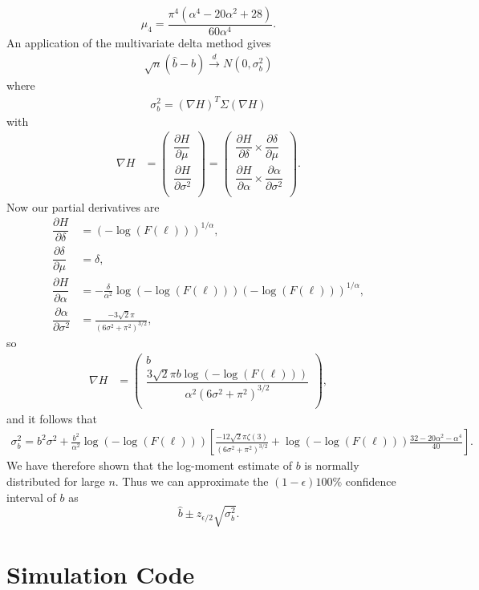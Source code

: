 \documentclass[honours,12pt]{unswthesis}
\newcommand{\1}{\mathbf 1}
\newcommand{\cd}{\overset{d}{\longrightarrow}}
\newcommand{\ppartial}[2]{\dfrac{\partial {#1}}{\partial {#2} }}
\numberwithin{equation}{section}
\theoremstyle{definition}
\theoremstyle{remark}
\begin{document}
\begin{appendices}
\[
\mu_4=\frac{\pi^4(\alpha^4-20\alpha^2+28)}{60\alpha^4}.
\] 
An application of the multivariate delta method gives
\begin{align*}
\sqrt{n}(\hat{b}-b)\cd N(0,\sigma^2_b)
\end{align*}
where
\begin{align*}
\sigma^2_b=(\nabla H)^T \Sigma (\nabla H)
\end{align*}
with
\begin{align*}
	\nabla H &=\begin{pmatrix}
		\ppartial{H}{\mu}\\
		\ppartial{H}{\sigma^2}\\
	\end{pmatrix}
	=\begin{pmatrix}
		\ppartial{H}{\delta}\times\ppartial{\delta}{\mu}\\
		\ppartial{H}{\alpha}\times\ppartial{\alpha}{\sigma^2}\\
	\end{pmatrix}.
\end{align*}
Now our partial derivatives are
\begin{align*}
\ppartial{H}{\delta}&=(-\log(F(\ell)))^{1/\alpha},\\ 
\ppartial{\delta}{\mu}&=\delta,\\
 \ppartial{H}{\alpha}&=-\frac{\delta}{\alpha^2}\log(-\log(F(\ell)))(-\log(F(\ell)))^{1/\alpha},\\ 
 \ppartial{\alpha}{\sigma^2}&=\frac{-3\sqrt{2}\pi}{(6\sigma^2+\pi^2)^{3/2}},
\end{align*}
so
\begin{align*}
	\nabla H &=\begin{pmatrix}
		b\\
		\dfrac{3\sqrt{2}\pi b \log(-\log(F(\ell)))}{\alpha^2(6\sigma^2+\pi^2)^{3/2}} \\
	\end{pmatrix},
\end{align*}
and it follows that
\begin{align*}
 \sigma^2_b= b^2\sigma^2 +\frac{b^2}{\alpha^2}\log(-\log(F(\ell)))
 \left[
 \frac{-12\sqrt{2}\pi\zeta(3)}{(6\sigma^2+\pi^2)^{3/2}} + \log(-\log(F(\ell)))\frac{32-20\alpha^2-\alpha^4}{40}
 \right].
\end{align*}
We have therefore shown that the log-moment estimate of $b$ is normally distributed for large $n$. Thus we can approximate the $(1-\epsilon)100\%$ confidence interval of $b$ as
\[
	\hat{b}\pm z_{\epsilon/2}\sqrt{\sigma^2_b}.
\]
\chapter{Simulation Code}

\end{appendices}
\end{document}

